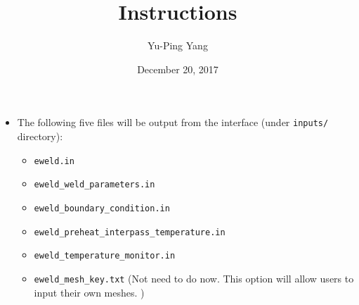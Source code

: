 \documentclass[12pt,letterpaper]{article}
\author{Yu-Ping Yang}
\date{December 20, 2017}
\title{Instructions}
\newcommand{\verbStyle}[1]{{\color{SteelBlue40}\colorbox{LightSteelBlue10}{{#1}}}}
\let\OldTexttt\texttt
\renewcommand{\texttt}[1]{\OldTexttt{\verbStyle{#1}}}
\begin{document}
\maketitle
\begin{itemize}
\item The following five files will be output from the interface (under \texttt{inputs/} directory):
\begin{itemize}
\item \texttt{eweld.in}
\item \texttt{eweld\_weld\_parameters.in}
\item \texttt{eweld\_boundary\_condition.in}
\item \texttt{eweld\_preheat\_interpass\_temperature.in}
\item \texttt{eweld\_temperature\_monitor.in}
\item \texttt{eweld\_mesh\_key.txt} (Not need to do now. This option will allow users to input their own meshes. )
\end{itemize}


\end{itemize}
\end{document}
